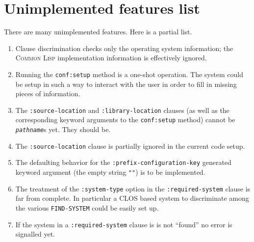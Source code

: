 \documentclass[a4paper]{article}
\newcommand{\CL}{\textsc{Common Lisp}}
\newcommand{\CLOS}{\textsc{CLOS}}
\newcommand{\code}[1]{\texttt{#1}}
\newcommand{\clobject}[1]{\texttt{\textit{#1}}} %
\begin{document}



\appendix

\section{Unimplemented features list}
\label{appendix:unimplemented}

There are many unimplemented features.  Here is a partial list.
\begin{enumerate}
\item	Clause discrimination checks only the operating system
	information; the \CL{} implementation information is
	effectively ignored.
\item	Running the \code{conf:setup} method is a one-shot
	operation. The system could be setup in such a way to interact
	with the user in order to fill in missing pieces of
	information.
\item	The \code{:source-location} and \code{:library-location}
	clauses (as well as the corresponding keyword arguments to the
	\code{conf:setup} method) cannot be \clobject{pathname}s
	yet. They should be.
\item	The \code{:source-location} clause is partially ignored in the
	current code setup.
\item	The defaulting behavior for the
	\code{:prefix-configuration-key} generated keyword argument
	(the empty string \code{""}) is to be implemented.
\item	The treatment of the \code{:system-type} option in the
	\code{:required-system} clause is far from complete. In
	particular a \CLOS{} based system to discriminate among the
	various \code{FIND-SYSTEM} could be easily set up.
\item	If the system in a \code{:required-system} clause is is not
	``found'' no error is signalled yet.
\end{enumerate}
\end{document}
